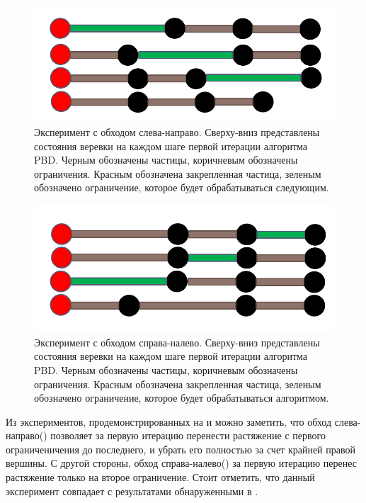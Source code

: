 	\begin{figure}[ht!] 
		\center
		\includegraphics [scale=0.35] {my_folder/images//experiment_forward.png}
		\caption{Эксперимент с обходом слева-направо. Сверху-вниз представлены состояния веревки на каждом шаге первой итерации алгоритма PBD. Черным обозначены частицы, коричневым обозначены ограничения. Красным обозначена закрепленная частица, зеленым обозначено ограничение, которое будет обрабатываться следующим.}
		\label{fig:experiment-forward}  
	\end{figure}

	\begin{figure}[ht!] 
		\center
		\includegraphics [scale=0.35] {my_folder/images//experiment_backward.png}
		\caption{Эксперимент с обходом справа-налево. Сверху-вниз представлены состояния веревки на каждом шаге первой итерации алгоритма PBD. Черным обозначены частицы, коричневым обозначены ограничения. Красным обозначена закрепленная частица, зеленым обозначено ограничение, которое будет обрабатываться алгоритмом.}
		\label{fig:experiment-backward}  
	\end{figure}	
	
	Из экспериментов, продемонстрированных на  и  можно заметить, что обход слева-направо() позволяет за первую итерацию перенести растяжение с первого ограниченичения до последнего, и убрать его полностью за счет крайней правой вершины. С другой стороны, обход справа-налево() за первую итерацию перенес растяжение только на второе ограничение. Стоит отметить, что данный эксперимент совпадает с результатами обнаруженными в \cite{gu2017constraint}.
	
